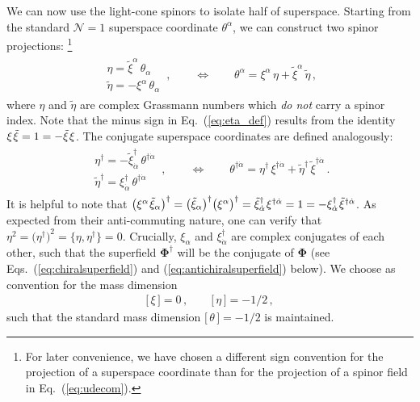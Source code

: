 \documentclass[12pt,document,nofootinbib,superscriptaddress,onecolumn,preprintnumbers,balancelastpage]{article}
\newcommand{\s}{\hspace{0.8pt}}
\DeclareRobustCommand{\Eq}[1]{Eq.~(\ref{#1})}
\DeclareRobustCommand{\Eqs}[2]{Eqs.~(\ref{#1}) and (\ref{#2})}
\begin{document}
\begin{spacing}{1.2}
We can now use the light-cone spinors to isolate half of superspace.
%
Starting from the standard $\mathcal{N} = 1$ superspace coordinate $\theta^\alpha$, we can construct two spinor projections:%
%
\footnote{For later convenience, we have chosen a different sign convention for the projection of a superspace coordinate than for the projection of a spinor field in \Eq{eq:udecom}.}
%
\begin{align}
\label{eq:eta_def}
\begin{array}{l}\eta =  \tilde{\xi}^\alpha\, \theta_\alpha \\[5pt] \tilde{\eta} = -\xi^\alpha\, \theta_\alpha \end{array}\,, \qquad \Longleftrightarrow \qquad \theta^\alpha = \xi^\alpha\, \eta + \tilde{\xi}^{\alpha}\, \tilde{\eta}\,,
\end{align}
where $\eta$ and $\tilde{\eta}$ are complex Grassmann numbers which \emph{do not} carry a spinor index.
%
Note that the minus sign in \Eq{eq:eta_def} results from the identity $ \xi \s \tilde{\xi}= 1 = - \tilde{\xi} \s\xi $.
%
The conjugate superspace coordinates are defined analogously:  
%
\vspace{-1mm}
\begin{align}
\begin{array}{l}\eta^\dagger =  - \tilde{\xi}^\dagger_{\dot{\alpha}}\, \theta^{\dagger\dot{\alpha}}\\[5pt]  \tilde{\eta}^\dagger = \xi^\dagger_{\dot{\alpha}}\, \theta^{\dagger\dot{\alpha}}\end{array}\,, \qquad \Longleftrightarrow \qquad \theta^{\dagger\dot{\alpha}} = \eta^\dagger \, \xi^{\dagger \dot{\alpha}} + \tilde{\eta}^\dagger \, \tilde{\xi}^{\dagger \dot{\alpha}}\,.
\end{align}
%
It is helpful to note that $\big(\xi^\alpha\s \tilde{\xi}_\alpha\big)^\dagger = \big(\tilde{\xi}_\alpha\big)^\dagger \big(\xi^\alpha\big)^\dagger = \tilde{\xi}^\dagger_{\dot{\alpha}}\s \xi^{\dagger \dot{\alpha}} =1 = - \xi^\dagger_{\dot{\alpha}}\s \tilde{\xi}^{\dagger \dot{\alpha}}$. 
As expected from their anti-commuting nature, one can verify that $\eta^2 = \big(\eta^\dagger\big)^2 = \big\{\eta, \eta^\dagger \big\} = 0$.
%
Crucially, $\xi_\alpha$ and $ \xi^{\dagger}_{\dot{\alpha}}$ are complex conjugates of each other, such that the superfield $\boldsymbol{\Phi}^\dagger$ will be the conjugate of $\boldsymbol{\Phi}$ (see \Eqs{eq:chiralsuperfield}{eq:antichiralsuperfield} below).
%
We choose as convention for the mass dimension 
\begin{align}
\big[\,\xi\,\big] = 0\,, \qquad \big[\,\eta\,\big] = -1/2 \,,
\end{align}
such that the standard mass dimension $\big[\,\theta\,\big] = -1/2$ is maintained.


\end{spacing}
\end{document}
